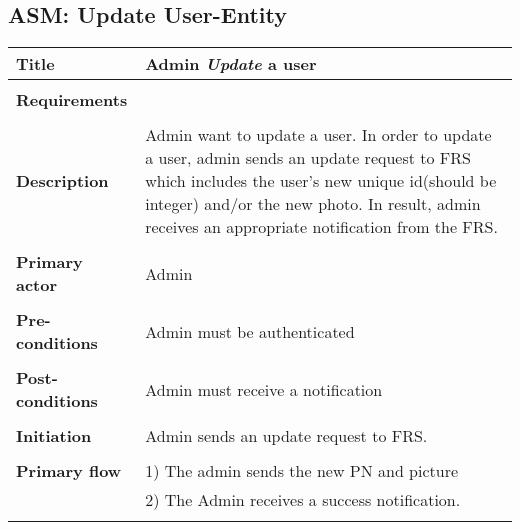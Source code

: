 \documentclass[a4paper,11pt]{article}
\begin{document}
\subsection{ASM: Update User-Entity}

\begin{tabular}{|p{4cm}|p{10cm}|} \hline 
  \textbf{Title} &   Admin \emph{Update} a user 
   
    \\ \hline \rowcolor{Gray} & \\ \hline 
    \textbf{Requirements} &     
    \\ \hline \rowcolor{Gray} & \\ \hline 
   
  \textbf{Description} &  Admin want to update a user. In order to update a user, admin sends an update request to FRS which includes the user's new unique id(should be integer) and/or the new photo. In result, admin receives an appropriate notification from the FRS. 
   
  \\ \hline \rowcolor{Gray} & \\ \hline 
   
  \textbf{Primary actor} & Admin   
   
  \\ \hline \rowcolor{Gray} & \\ \hline  
   
  \textbf{Pre-conditions} &   Admin must be authenticated 
   
  \\ \hline \rowcolor{Gray} & \\ \hline 
   
  \textbf{Post-conditions} &   Admin must receive a notification 
   
  \\ \hline \rowcolor{Gray} & \\ \hline  
   
  \textbf{Initiation} & Admin sends an update request to FRS. 
   
  \\ \hline \rowcolor{Gray} & \\ \hline  
   
  \textbf{Primary flow} &  
  1) The admin sends the new PN and picture \\& 
  2) The Admin receives a success notification. 
   
  \\ \hline \rowcolor{Gray} & \\ \hline  
   

\end{tabular}
\end{document}
